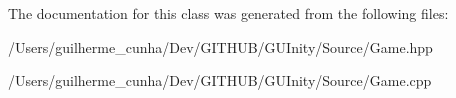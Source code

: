 The documentation for this class was generated from the following files\+:\begin{DoxyCompactItemize}
\item 
/\+Users/guilherme\+\_\+cunha/\+Dev/\+G\+I\+T\+H\+U\+B/\+G\+U\+Inity/\+Source/Game.\+hpp\item 
/\+Users/guilherme\+\_\+cunha/\+Dev/\+G\+I\+T\+H\+U\+B/\+G\+U\+Inity/\+Source/Game.\+cpp\end{DoxyCompactItemize}
